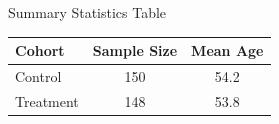 \documentclass[14pt,t]{beamer}
\begin{document}
\begin{frame}{Summary Statistics Table}
\begin{table}
\begin{tabular}{lcc}
\hline
Cohort & Sample Size & Mean Age \\
\hline
Control & 150 & 54.2 \\
Treatment & 148 & 53.8 \\
\hline
\end{tabular}
\end{table}
\end{frame}
\end{document}
